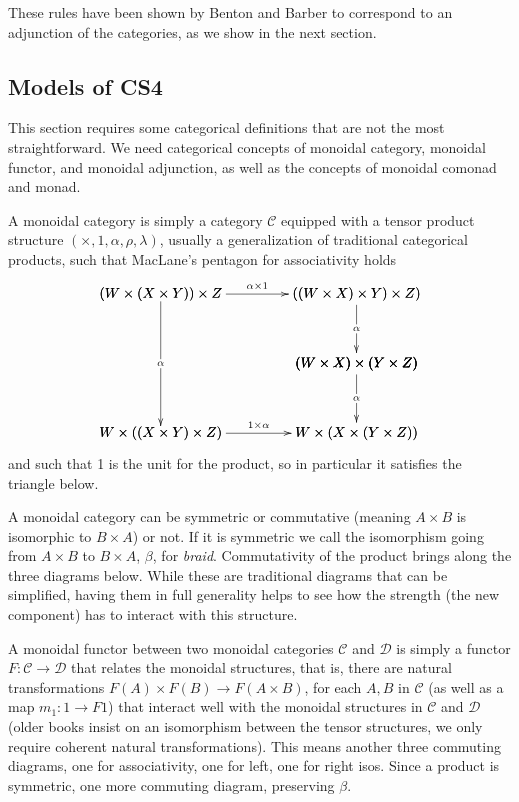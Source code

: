 \documentclass{article}
\let\mto\to
\let\to\relax
\newcommand{\to}{\rightarrow}
\newcommand{\cat}[1]{\mathcal{#1}}
\begin{document}
These rules have been shown by Benton \cite{benton1995} and Barber to correspond to an adjunction of the categories, as we show in the next section.  

\subsection{Models of CS4}
\label{subsec:single_adjoint_model_of_cs4}

This section requires  some categorical definitions that are not the most straightforward.  We need categorical concepts of monoidal category, monoidal functor, and monoidal adjunction, as well as the concepts of monoidal comonad and monad. 

A monoidal category is simply a category $\cat{C}$  equipped with a tensor product structure $(\times, 1, \alpha, \rho, \lambda)$, usually a generalization of traditional categorical products, such that  MacLane's pentagon for associativity holds
\[ \bfig
      \vSquares|ammmmma|/>``>```>`>/[(W \times (X \times Y))\times Z `((W \times X) \times Y)\times Z)``(W\times X)\times (Y\times Z)`W \times ((X \times Y)\times Z)`W \times (X \times (Y\times Z));\alpha\times 1``\alpha```\alpha`1\times \alpha]
      \morphism(0,1000)|m|/->/<0,-950>[`;\alpha]
      \efig\]
    and such that 1 is the unit for the product, so in particular it satisfies the triangle below.
    \[ \]
    
    
  A monoidal category can be symmetric or commutative (meaning $A\times B$ is isomorphic to $B\times A$) or not. If it is symmetric we call the isomorphism going from $ A\times B$ to $B\times A$, $\beta$, for  \textit{braid}. 
       Commutativity of the product brings along the three diagrams below. While these are traditional diagrams that can be simplified, having them in full generality helps to see how the strength (the new component) has to interact with this structure.

A monoidal functor between two monoidal categories $\cat{C}$ and $\cat{D}$ is simply a functor $F\colon \cat{C} \mto \cat{D}$ that relates the monoidal structures, that is, there are natural transformations  $F(A)\times F(B)\mto F(A \times B)$, for each $A,B$ in $\cat{C}$ (as well as a map $m_{1}\colon 1 \mto F1$) that interact well with the monoidal structures  in $\cat{C}$ and  $\cat{D}$ (older books insist on an isomorphism between the tensor structures, we only require coherent natural transformations). This means another three commuting diagrams, one for associativity, one for left, one for right isos. Since a product is symmetric, one more commuting diagram, preserving $\beta$.
\end{document}
